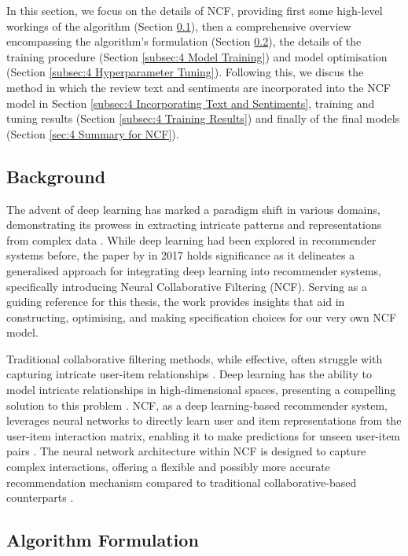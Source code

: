 In this section, we focus on the details of NCF, providing first some high-level workings of the algorithm (Section \ref{subsec:4 Background}), then a comprehensive overview encompassing the algorithm's formulation (Section \ref{subsec:4 Algorithm Formulation for NCF}), the details of the training procedure (Section \ref{subsec:4 Model Training}) and model optimisation (Section \ref{subsec:4 Hyperparameter Tuning}). Following this, we discus the method in which the review text and sentiments are incorporated into the NCF model in Section \ref{subsec:4 Incorporating Text and Sentiments}, training and tuning results (Section \ref{subsec:4 Training Results}) and finally of the final models (Section \ref{sec:4 Summary for NCF}).

\subsection{Background}
\label{subsec:4 Background}

The advent of deep learning has marked a paradigm shift in various domains, demonstrating its prowess in extracting intricate patterns and representations from complex data \cite{steck2021deep}. While deep learning had been explored in recommender systems before, the paper by \cite{he2017neural} in 2017 holds significance as it delineates a generalised approach for integrating deep learning into recommender systems, specifically introducing Neural Collaborative Filtering (NCF). Serving as a guiding reference for this thesis, the work provides insights that aid in constructing, optimising, and making specification choices for our very own NCF model.

Traditional collaborative filtering methods, while effective, often struggle with capturing intricate user-item relationships \cite{steck2021deep}. Deep learning has the ability to model intricate relationships in high-dimensional spaces, presenting a compelling solution to this problem \cite{he2017neural}. NCF, as a deep learning-based recommender system, leverages neural networks to directly learn user and item representations from the user-item interaction matrix, enabling it to make predictions for unseen user-item pairs \cite{he2017neural}. The neural network architecture within NCF is designed to capture complex interactions, offering a flexible and possibly more accurate recommendation mechanism compared to traditional collaborative-based counterparts \cite{he2017neural}.

\subsection{Algorithm Formulation}
\label{subsec:4 Algorithm Formulation for NCF}

